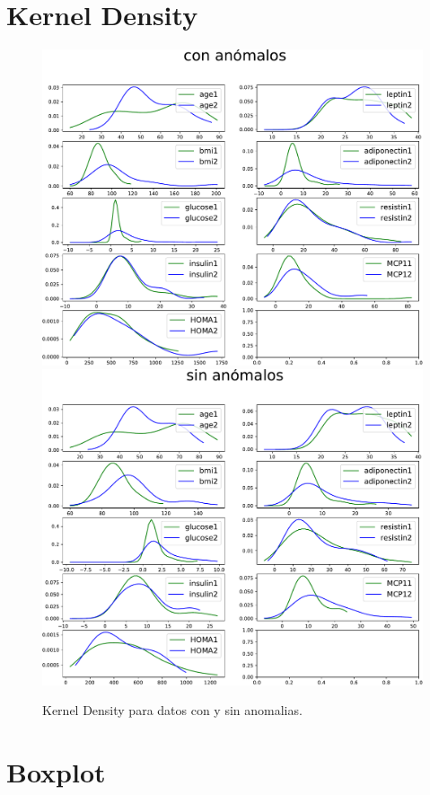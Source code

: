 \documentclass{article}
\begin{document}


\section{Kernel Density}

\begin{figure}[h]
\centering
\includegraphics[width = 0.49\linewidth]{../python/images/kden.pdf}
\includegraphics[width = 0.49\linewidth]{../python/images/kden1.pdf}
\caption{Kernel Density para datos con y sin anomalias.}
\label{fig:kdens}
\end{figure}



\section{Boxplot}
\end{document}
